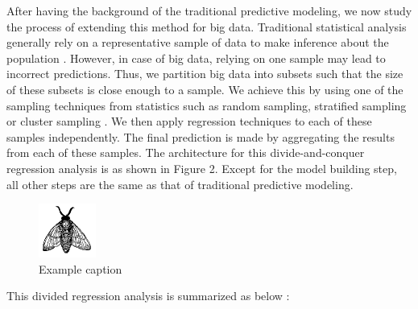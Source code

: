 \documentclass[sigconf]{acmart}
\begin{document}
After having the background of the traditional predictive modeling, we now study the process of extending this method for big data. Traditional statistical analysis generally rely on a representative sample of data to make inference about the population \cite{part-reg}. However, in case of big data, relying on one sample may lead to incorrect predictions. Thus, we partition big data into subsets such that the size of these subsets is close enough to a sample. We achieve this by using one of the sampling techniques from statistics such as random sampling, stratified sampling or cluster sampling \cite{div-reg}. We then apply regression techniques to each of these samples independently. The final prediction is made by aggregating the results from each of these samples. The architecture for this divide-and-conquer regression analysis is as shown in Figure 2. Except for the model building step, all other steps are the same as that of traditional predictive modeling.

\begin{figure}[!ht]
  \centering\includegraphics[width=\columnwidth]{images/fly.pdf}
  \caption{Example caption}\label{f:fly}
\end{figure}

This divided regression analysis is summarized as below \cite{div-reg}:
\end{document}
